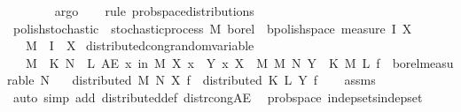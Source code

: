 \begin{isabellebody}
\ \ \ \ \ \ \isamarkupfalse%
\ argo\isanewline
\ \ \isamarkupfalse%
\isanewline
{}\isamarkupfalse%
\ {\isacharparenleft}{\kern0pt}rule\ prob{\isacharunderscore}{\kern0pt}space{\isacharunderscore}{\kern0pt}distributions{\isacharparenright}{\kern0pt}%
\endisatagproof
{\isafoldproof}%
%
\isadelimproof
\isanewline
%
\endisadelimproof
\isanewline
{}\isamarkupfalse%
\ polish{\isacharunderscore}{\kern0pt}stochastic\ {\isacharequal}{\kern0pt}\ stochastic{\isacharunderscore}{\kern0pt}process\ M\ {\isachardoublequoteopen}borel\ {\isacharcolon}{\kern0pt}{\isacharcolon}{\kern0pt}\ {\isacharprime}{\kern0pt}b{\isacharcolon}{\kern0pt}{\isacharcolon}{\kern0pt}polish{\isacharunderscore}{\kern0pt}space\ measure{\isachardoublequoteclose}\ I\ X\isanewline
\ \ \ M\ \ I\ \ X\isanewline
\isanewline
\isanewline
\isanewline
{}\isamarkupfalse%
\ distributed{\isacharunderscore}{\kern0pt}cong{\isacharunderscore}{\kern0pt}random{\isacharunderscore}{\kern0pt}variable{\isacharcolon}{\kern0pt}\isanewline
\ \ \ {\isachardoublequoteopen}M\ {\isacharequal}{\kern0pt}\ K{\isachardoublequoteclose}\ {\isachardoublequoteopen}N\ {\isacharequal}{\kern0pt}\ L{\isachardoublequoteclose}\ {\isachardoublequoteopen}AE\ x\ in\ M{\isachardot}{\kern0pt}\ X\ x\ {\isacharequal}{\kern0pt}\ Y\ x{\isachardoublequoteclose}\ {\isachardoublequoteopen}X\ {\isasymin}\ M\ {\isasymrightarrow}\isactrlsub M\ N{\isachardoublequoteclose}\ {\isachardoublequoteopen}Y\ {\isasymin}\ K\ {\isasymrightarrow}\isactrlsub M\ L{\isachardoublequoteclose}\ {\isachardoublequoteopen}f\ {\isasymin}\ borel{\isacharunderscore}{\kern0pt}measurable\ N{\isachardoublequoteclose}\isanewline
\ \ \ {\isachardoublequoteopen}distributed\ M\ N\ X\ f\ {\isasymlongleftrightarrow}\ distributed\ K\ L\ Y\ f{\isachardoublequoteclose}\isanewline
%
\isadelimproof
\ \ %
\endisadelimproof
%
\isatagproof
{}\isamarkupfalse%
\ assms\ \isamarkupfalse%
\ {\isacharparenleft}{\kern0pt}auto\ simp\ add{\isacharcolon}{\kern0pt}\ distributed{\isacharunderscore}{\kern0pt}def\ distr{\isacharunderscore}{\kern0pt}cong{\isacharunderscore}{\kern0pt}AE{\isacharparenright}{\kern0pt}%
\endisatagproof
{\isafoldproof}%
%
\isadelimproof
\isanewline
%
\endisadelimproof
\isanewline
{}\isamarkupfalse%
\ {\isacharparenleft}{\kern0pt}\ prob{\isacharunderscore}{\kern0pt}space{\isacharparenright}{\kern0pt}\ indep{\isacharunderscore}{\kern0pt}sets{\isacharunderscore}{\kern0pt}indep{\isacharunderscore}{\kern0pt}set{\isacharcolon}{\kern0pt}\isanewline

\end{isabellebody}
